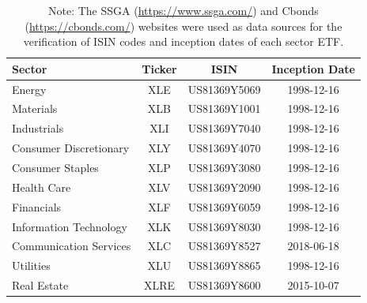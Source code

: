
\begin{table}[ht]
\centering
\caption{Overview of the Select Sector SPDR ETFs included in this study, detailing each ETF's corresponding GICS sector, ticker symbol, International Securities Identification Number (ISIN), and inception date.}
\label{tab:sector_etfs}
\begin{tabular}{|l|c|c|c|}
\hline
\textbf{Sector} & \textbf{Ticker} & \textbf{ISIN} & \textbf{Inception Date} \\
\hline
Energy                  & XLE   & US81369Y5069 & 1998-12-16 \\
Materials               & XLB   & US81369Y1001 & 1998-12-16 \\
Industrials             & XLI   & US81369Y7040 & 1998-12-16 \\
Consumer Discretionary  & XLY   & US81369Y4070 & 1998-12-16 \\
Consumer Staples        & XLP   & US81369Y3080 & 1998-12-16 \\
Health Care             & XLV   & US81369Y2090 & 1998-12-16 \\
Financials              & XLF   & US81369Y6059 & 1998-12-16 \\
Information Technology  & XLK   & US81369Y8030 & 1998-12-16 \\
Communication Services  & XLC   & US81369Y8527 & 2018-06-18 \\
Utilities               & XLU   & US81369Y8865 & 1998-12-16 \\
Real Estate             & XLRE  & US81369Y8600 & 2015-10-07 \\
\hline
\end{tabular}
\caption*{\footnotesize
Note: The SSGA (\url{https://www.ssga.com/}) and Cbonds (\url{https://cbonds.com/}) websites were used as data sources for the verification of ISIN codes and inception dates of each sector ETF.
}
\end{table}


